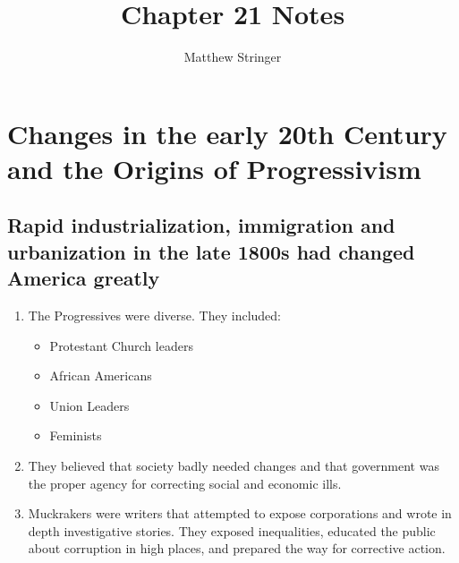 \documentclass[12pt]{article} %
\title{Chapter 21 Notes} %
\author{Matthew Stringer} %
\begin{document}
\maketitle
\tableofcontents
\newpage

\section{Changes in the early 20th Century and the Origins of Progressivism}
\subsection{Rapid industrialization, immigration and urbanization in the late 1800s had changed America greatly}
\begin{enumerate}
	\item The Progressives were diverse. They included:
	\begin{itemize}
		\item Protestant Church leaders
		\item African Americans
		\item Union Leaders
		\item Feminists
	\end{itemize}
	\item They believed that society badly needed changes and that government was the proper agency
		for correcting social and economic ills.
	\item Muckrakers were writers that attempted to expose corporations and wrote in depth 
		investigative stories. They exposed inequalities, educated the public about corruption in
		high places, and prepared the way for corrective action.
\end{enumerate}
\end{document}
